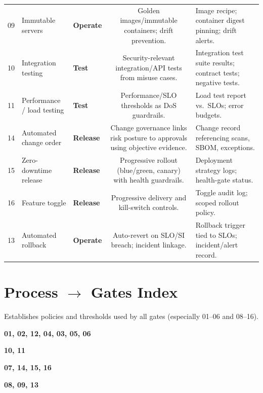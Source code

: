 \documentclass[11pt]{article}
\begin{document}
\begin{longtable}{@{}p{} Y p{0.13\textwidth} S E@{}}
09 & Immutable servers
   & \textbf{Operate}
   & Golden images/immutable containers; drift prevention.
   & Image recipe; container digest pinning; drift alerts. \\

10 & Integration testing
   & \textbf{Test}
   & Security-relevant integration/API tests from misuse cases.
   & Integration test suite results; contract tests; negative tests. \\

11 & Performance / load testing
   & \textbf{Test}
   & Performance/SLO thresholds as DoS guardrails.
   & Load test report vs.\ SLOs; error budgets. \\

14 & Automated change order
   & \textbf{Release}
   & Change governance links risk posture to approvals using objective evidence.
   & Change record referencing scans, SBOM, exceptions. \\

15 & Zero-downtime release
   & \textbf{Release}
   & Progressive rollout (blue/green, canary) with health guardrails.
   & Deployment strategy logs; health-gate status. \\

16 & Feature toggle
   & \textbf{Release}
   & Progressive delivery and kill-switch controls.
   & Toggle audit log; scoped rollout policy. \\

13 & Automated rollback
   & \textbf{Operate}
   & Auto-revert on SLO/SI breach; incident linkage.
   & Rollback trigger tied to SLOs; incident/alert record. \\
\bottomrule
\end{longtable}
\normalsize

\section{Process \texorpdfstring{$\rightarrow$}{→} Gates Index}
\begin{description}[leftmargin=1.4em,labelsep=0.5em,style=nextline]
  \item[\textbf{Plan/Design}] Establishes policies and thresholds used by all gates (especially 01--06 and 08--16).
  \item[\textbf{Build}] \textbf{01, 02, 12, 04, 03, 05, 06}
  \item[\textbf{Test}] \textbf{10, 11}
  \item[\textbf{Release}] \textbf{07, 14, 15, 16}
  \item[\textbf{Operate}] \textbf{08, 09, 13}
\end{description}
\end{document}
